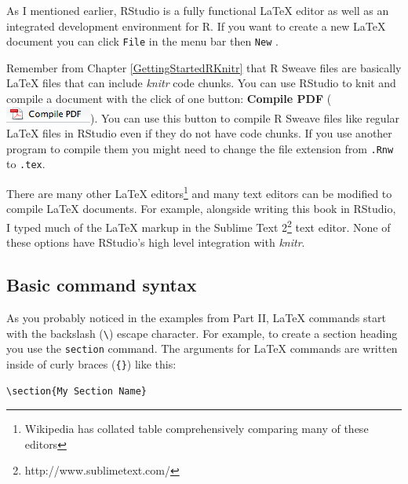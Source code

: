 As I mentioned earlier, RStudio is a fully functional LaTeX editor as well as an integrated development environment for R. If you want to create a new LaTeX document you can click {\tt{File}} in the menu bar then {\tt{New}} . 

Remember from Chapter \ref{GettingStartedRKnitr} that R Sweave files are basically LaTeX files that can include {\emph{knitr}} code chunks. You can use RStudio to knit and compile a document with the click of one button: \textbf{Compile PDF} (\includegraphics[scale=0.5]{Children/Chapter11/images11/CompilePDF.png}). You can use this button to compile R Sweave files like regular LaTeX files in RStudio even if they do not have code chunks. If you use another program to compile them you might need to change the file extension from {\tt{.Rnw}} to {\tt{.tex}}.

There are many other LaTeX editors\footnote{Wikipedia has collated table comprehensively comparing many of these editors} and many text editors can be modified to compile LaTeX documents. For example, alongside writing this book in RStudio, I typed much of the LaTeX markup in the Sublime Text 2\footnote{http://www.sublimetext.com/} text editor. None of these options have RStudio's high level integration with \emph{knitr}.

\subsection{Basic command syntax}

As you probably noticed in the examples from Part II, LaTeX commands start with the backslash (\texttt{\textbackslash{}}) escape character. For example, to create a section heading you use the \texttt{section} command. The arguments for LaTeX commands are written inside of curly braces (\verb|{}|) like this:

\begin{knitrout}
    \color{fgcolor}
    \begin{kframe}
        \begin{verbatim}
\section{My Section Name}
            \end{verbatim}
        \end{kframe}
\end{knitrout}

